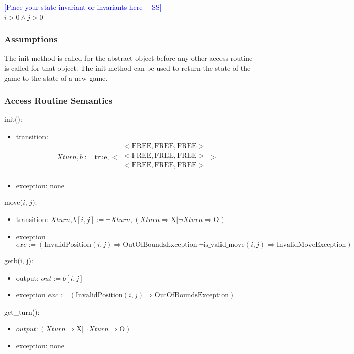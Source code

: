 \documentclass[12pt,fleqn]{examtst}
\newcommand{\authornote}[3]{\textcolor{#1}{[#3 ---#2]}}
\newcommand{\authornote}[3]{}
\newcommand{\wss}[1]{\authornote{blue}{SS}{#1}}
\begin{document}
\wss{Place your state invariant or invariants here}\\
$i > 0 \wedge j > 0$

\subsubsection* {Assumptions}

The init method is called for the abstract object before any other access routine is called for that
object.  The init method can be used to return the state of the game to the state of a new game.

\subsubsection* {Access Routine Semantics}

init():
\begin{itemize}
\item transition: 
$$\mathit{Xturn}, b := \text{true}, 
< \begin{array}{c}
< \mbox{FREE}, \mbox{FREE}, \mbox{FREE} >\\
< \mbox{FREE}, \mbox{FREE}, \mbox{FREE} >\\
< \mbox{FREE}, \mbox{FREE}, \mbox{FREE} >\\
\end{array} >
$$
\item exception: none
\end{itemize}

\noindent move($i$, $j$):
\begin{itemize}
\item transition: $\mathit{Xturn}, b[i, j] := \neg \mathit{Xturn}, (\mathit{Xturn} \Rightarrow \mbox{X} | \neg
\mathit{Xturn} \Rightarrow \mbox{O})$
\item exception
$$exc := (\mbox{InvalidPosition}(i, j) \Rightarrow \mbox{OutOfBoundsException} | \neg \mbox{is\_valid\_move}(i, j)
\Rightarrow \mbox{InvalidMoveException})$$
\end{itemize}

\noindent getb(i, j):
\begin{itemize}
\item output: $\mathit{out} := b[i, j]$
\item exception
$exc := (\mbox{InvalidPosition}(i, j) \Rightarrow \mbox{OutOfBoundsException})$
\end{itemize}

\noindent get\_turn():
\begin{itemize}
\item $output: (\mathit{Xturn} \Rightarrow \mbox{X} | \neg \mathit{Xturn} \Rightarrow \mbox{O})$

\item exception: none
\end{itemize}
\end{document}
